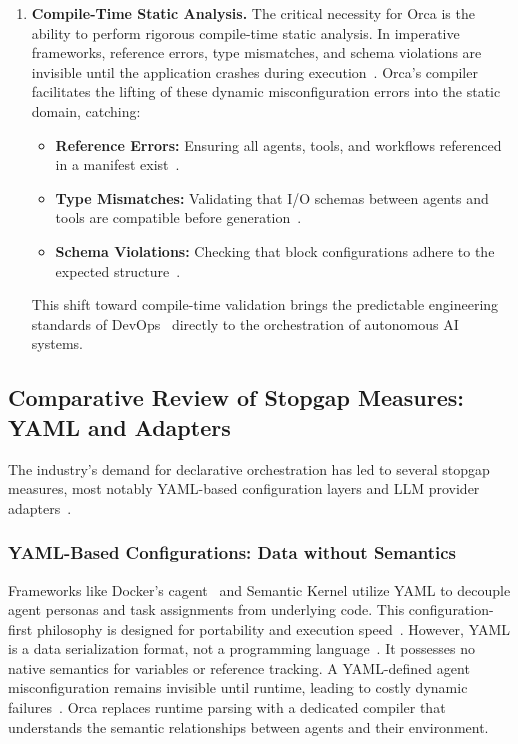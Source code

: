 \documentclass[sigconf,nonacm]{acmart}
\begin{document}
\begin{enumerate}[leftmargin=*]
  \item \textbf{Compile-Time Static Analysis.} The critical necessity for Orca
        is the ability to perform rigorous compile-time static analysis. In
        imperative frameworks, reference errors, type mismatches, and schema
        violations are invisible until the application crashes during
        execution~\cite{docker2025cagent,terraform2024}. Orca's compiler
        facilitates the lifting of these dynamic misconfiguration errors into
        the static domain, catching:
        \begin{itemize}[leftmargin=*]
          \item \textbf{Reference Errors:} Ensuring all agents, tools, and
                workflows referenced in a manifest exist~\cite{terraform2024}.
          \item \textbf{Type Mismatches:} Validating that I/O schemas between
                agents and tools are compatible before generation~\cite{schick2023toolformer}.
          \item \textbf{Schema Violations:} Checking that block configurations
                adhere to the expected structure~\cite{terraform2024}.
        \end{itemize}
        This shift toward compile-time validation brings the predictable
        engineering standards of DevOps~\cite{terraform2024} directly to the
        orchestration of autonomous AI systems.
\end{enumerate}

\subsection{Comparative Review of Stopgap Measures: YAML and Adapters}
\label{sec:litreview:stopgap}

The industry's demand for declarative orchestration has led to several
stopgap measures, most notably YAML-based configuration layers and LLM
provider adapters~\cite{litellm2024,docker2025cagent}.

\subsubsection{YAML-Based Configurations: Data without Semantics}
\label{sec:litreview:yaml-semantics}

Frameworks like Docker's cagent~\cite{docker2025cagent} and Semantic Kernel
utilize YAML to decouple agent personas and task assignments from
underlying code. This configuration-first philosophy is designed for
portability and execution speed~\cite{docker2025cagent}. However, YAML is a
data serialization format, not a programming language~\cite{terraform2024}. It
possesses no native semantics for variables or reference tracking. A
YAML-defined agent misconfiguration remains invisible until runtime, leading
to costly dynamic failures~\cite{docker2025cagent}. Orca replaces runtime
parsing with a dedicated compiler that understands the semantic relationships
between agents and their environment.
\end{document}
